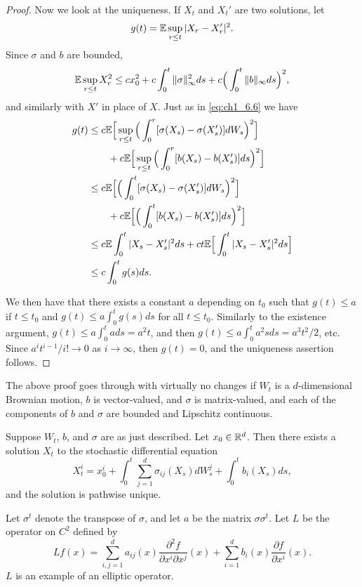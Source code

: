 \begin{proof}
Now we look at the uniqueness. If $X_t$ and $X_t'$ are two solutions, let
\[
    g(t) = \mathbb{E} \sup_{r\leq t} |X_r - X_r'|^2.
\]
Since $\sigma$ and $b$ are bounded,
\[
    \mathbb{E} \sup_{r\le t} X_r^2\le cx_0^2 +c\int_0^t \|\sigma\|_\infty^2ds +c\Big(\int_0^t \|b\|_\infty ds\Big)^2,
\]
and similarly with $X'$ in place of $X$. Just as in \eqref{eq:ch1_6.6} we have
\begin{align}\label{eq:ch1_6.8}
    g(t) &\leq c\mathbb{E}\Big[\sup_{r\leq t}\Big(\int_0^r [\sigma(X_s) - \sigma(X_s')]dW_s\Big)^2\Big] \\
    &\qquad+ c\mathbb{E}\Big[\sup_{r\leq t}\Big(\int_0^r [b(X_s) - b(X_s')]ds\Big)^2\Big] \notag \\
    &\leq c\mathbb{E}\Big[\Big(\int_0^t [\sigma(X_s) - \sigma(X_s')]dW_s\Big)^2\Big]  \notag \\
    &\qquad+ c\mathbb{E}\Big[\Big(\int_0^t [b(X_s) - b(X_s')]ds\Big)^2\Big]  \notag \\
    &\leq c\mathbb{E}\int_0^t |X_s - X_s'|^2ds + ct\mathbb{E}\Big[\int_0^t |X_s - X_s'|^2ds\Big]  \notag \\
    &\leq c \int_0^t g(s)ds.  \notag
\end{align}

We then have that there exists a constant $a$ depending on $t_0$ such that $g(t) \leq a$ if $t \leq t_0$ and $g(t) \leq a \int_0^t g(s)ds$ for all $t \leq t_0$. Similarly to the existence argument, $g(t) \leq a \int_0^t a ds = a^2t$, and then $g(t) \leq a \int_0^t a^2sds = a^3t^2/2$, etc. Since $a^it^{i-1}/i! \to 0$ as $i \to \infty$, then $g(t) = 0$, and the uniqueness assertion follows.
\end{proof}

The above proof goes through with virtually no changes if $W_t$ is a $d$-dimensional Brownian motion, $b$ is vector-valued, and $\sigma$ is matrix-valued, and each of the components of $b$ and $\sigma$ are bounded and Lipschitz continuous.

\begin{theorem}\label{thm:ch1_6.2}
Suppose $W_t$, $b$, and $\sigma$ are as just described. Let $x_0 \in \mathbb{R}^d$. Then there exists a solution $X_t$ to the stochastic differential equation
\begin{equation}\label{eq:ch1_6.9}
    X_t^i = x_0^i + \int_0^t \sum_{j=1}^d \sigma_{ij}(X_s)dW_s^j + \int_0^t b_i(X_s)ds,
\end{equation}
and the solution is pathwise unique.
\end{theorem}

Let $\sigma^t$ denote the transpose of $\sigma$, and let $a$ be the matrix $\sigma\sigma^t$. Let $L$ be the operator on $C^2$ defined by
\begin{equation}\label{eq:ch1_6.10}
    Lf(x) = \sum_{i,j=1}^d a_{ij}(x)\frac{\partial^2 f}{\partial x^i\partial x^j}(x) + \sum_{i=1}^d b_i(x)\frac{\partial f}{\partial x^i}(x).
\end{equation}
$L$ is an example of an elliptic operator.

